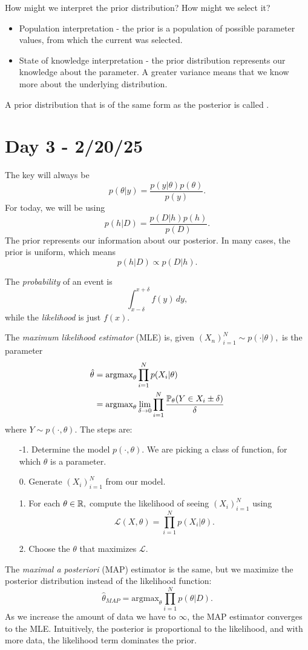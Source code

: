 \documentclass{chaistyle}
\begin{document}
\begin{enumerate}[1.]
\begin{example*}
        How might we interpret the prior distribution? How might we select it? 
        \begin{itemize}[-]
            \item Population interpretation - the prior is a population of possible parameter values, from which the current was selected.
            \item State of knowledge interpretation - the prior distribution represents our knowledge about the parameter. A greater variance means that we know more about the underlying distribution.
        \end{itemize}
        A prior distribution that is of the same form as the posterior is called .
    \end{example*}
\end{enumerate}
\section*{Day 3 - 2/20/25}
The key will always be \[p(\theta|y)=\frac{p(y|\theta)p(\theta)}{p(y)}.\] For today, we will be using \[p(h|D)=\frac{p(D|h)p(h)}{p(D)}.\] The prior represents our information about our posterior. In many cases, the prior is uniform, which means \[p(h|D)\propto p(D|h).\] 

The \textit{probability} of an event is \[\int_{x-\delta}^{x+\delta}f(y)\,dy,\] while the \textit{likelihood} is just \(f(x).\)

The \textit{maximum likelihood estimator} (MLE) is, given \((X_n)_{i=1}^N\sim p(\cdot|\theta),\) is the parameter \begin{align*}
    \hat\theta&=\text{argmax}_\theta\prod_{i=1}^Np(X_i|\theta) \\ 
    &= \text{argmax}_\theta \lim_{\delta \to 0} \prod_{i=1}^N \frac{\P_\theta(Y\in X_i\pm\delta)}{\delta}
\end{align*}
where \(Y\sim p(\cdot,\theta).\)
The steps are: \begin{enumerate}
    \item[-1.] Determine the model \(p(\cdot,\theta).\) We are picking a class of function, for which \(\theta\) is a parameter.
    \item[0.] Generate \((X_i)_{i=1}^N\) from our model.
    \item[1.] For each \(\theta\in\R,\) compute the likelihood of seeing \((X_i)_{i=1}^N\) using \[\mathcal{L}(X,\theta)=\prod_{i=1}^N p(X_i|\theta).\]
    \item[2.] Choose the \(\theta\) that maximizes \(\mathcal{L}.\)
\end{enumerate}
The \textit{maximal a posteriori} (MAP) estimator is the same, but we maximize the posterior distribution instead of the likelihood function: \[\hat\theta_{MAP}=\text{argmax}_\theta \prod_{i=1}^N p(\theta|D).\]
As we increase the amount of data we have to \(\infty\), the MAP estimator converges to the MLE. Intuitively, the posterior is proportional to the likelihood, and with more data, the likelihood term dominates the prior.
\end{document}

